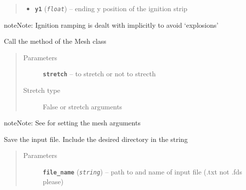 \documentclass[letterpaper,10pt,english]{sphinxmanual}
\begin{document}
\begin{fulllineitems}
\begin{fulllineitems}
\begin{quote}
\begin{description}
\begin{itemize}
\item {} 
\textbf{\texttt{y1}} (\emph{\texttt{float}}) -- ending y position of the ignition strip

\end{itemize}

\end{description}\end{quote}

\begin{notice}{note}{Note:}
Ignition ramping is dealt with implicitly to avoid `explosions'
\end{notice}

\end{fulllineitems}


\begin{fulllineitems}
\label{wfds_WFDS:wfds.WFDS.create_mesh}
Call the  method of the Mesh class
\begin{quote}\begin{description}
\item[{Parameters}] \leavevmode
\textbf{\texttt{stretch}} -- to stretch or not to strecth

\item[{Stretch type}] \leavevmode
False or stretch arguments

\end{description}\end{quote}

\begin{notice}{note}{Note:}
See  for setting the mesh arguments
\end{notice}

\end{fulllineitems}


\begin{fulllineitems}
\label{wfds_WFDS:wfds.WFDS.save_input}
Save the input file. Include the desired directory in the string
\begin{quote}\begin{description}
\item[{Parameters}] \leavevmode
\textbf{\texttt{file\_name}} (\emph{\texttt{string}}) -- path to and name of input file (.txt not .fds please)


\end{description}
\end{quote}
\end{fulllineitems}
\end{fulllineitems}
\end{document}
